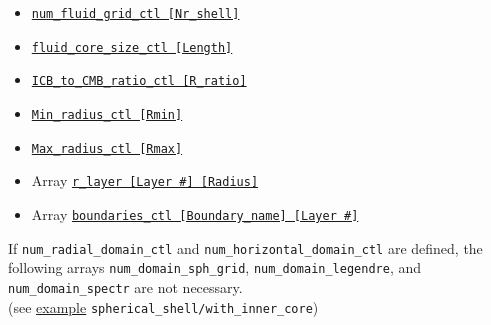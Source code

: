 \begin{itemize}
\begin{itemize}
%
			\item \hyperref[href_t:num_fluid_grid_ctl]{\tt num\_fluid\_grid\_ctl  [Nr\_shell]}
			\item \hyperref[href_t:fluid_core_size_ctl]{\tt fluid\_core\_size\_ctl  [Length]}
			\item \hyperref[href_t:ICB_to_CMB_ratio_ctl]{\tt ICB\_to\_CMB\_ratio\_ctl  [R\_ratio]}
			\item \hyperref[href_t:Min_radius_ctl]{\tt Min\_radius\_ctl  [Rmin]}    
				\label{href_i:Min_radius_ctl}
			\item \hyperref[href_t:Max_radius_ctl]{\tt Max\_radius\_ctl  [Rmax]}    
				\label{href_i:Max_radius_ctl}
%
\\
			\item Array \hyperref[href_t:r_layer]{\tt r\_layer  [Layer \#]  [Radius]}    
%
			\item Array \hyperref[href_t:boundaries_ctl]{\tt boundaries\_ctl  [Boundary\_name]  [Layer \#]}    
			\end{itemize}
		\end{itemize}

If \verb|num_radial_domain_ctl| and \verb|num_horizontal_domain_ctl| are defined, the following arrays \verb|num_domain_sph_grid|, \verb|num_domain_legendre|, and \verb|num_domain_spectr| are not necessary. \\
(see \hyperref[href_t:gen_w_innercore]{example} \verb|spherical_shell/with_inner_core|)

